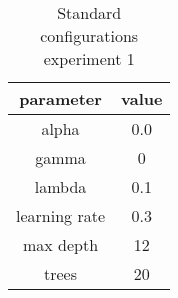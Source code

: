 \begin{table}
\centering
\begin{tabular}{| c|c|}
\hline\hline
parameter & value\\
\hline
alpha & 0.0\\\hline
gamma & 0\\\hline
lambda & 0.1\\\hline
learning rate & 0.3\\\hline
max depth & 12\\\hline
trees & 20\\\hline

\end{tabular}\caption{Standard configurations experiment 1} 
\label{tab:./Table/config experiment 2 targetandshadow}
\end{table}
